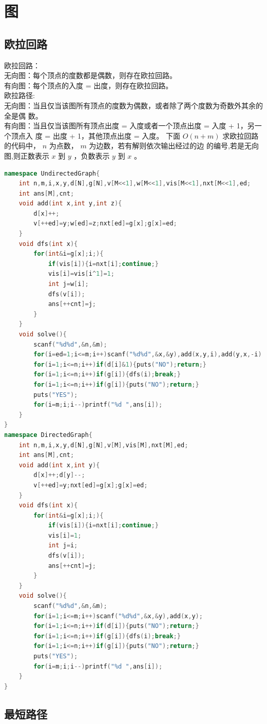 \documentclass{article}
\begin{document}
\section{图}
\subsection{欧拉回路}
欧拉回路： \\
无向图：每个顶点的度数都是偶数，则存在欧拉回路。 \\
有向图：每个顶点的入度 = 出度，则存在欧拉回路。 \\
欧拉路径: \\
无向图：当且仅当该图所有顶点的度数为偶数，或者除了两个度数为奇数外其余的全是偶
数。 \\
有向图：当且仅当该图所有顶点出度 = 入度或者一个顶点出度 = 入度 + 1，另一个顶点入
度 = 出度 + 1，其他顶点出度 = 入度。
下面 $O(n + m)$ 求欧拉回路的代码中， $n$ 为点数， $m$ 为边数，若有解则依次输出经过的边
的编号,若是无向图,则正数表示 $x$ 到 $y$ ，负数表示 $y$ 到 $x$ 。
\begin{lstlisting}[language=C++]
namespace UndirectedGraph{
	int n,m,i,x,y,d[N],g[N],v[M<<1],w[M<<1],vis[M<<1],nxt[M<<1],ed;
	int ans[M],cnt;
	void add(int x,int y,int z){
		d[x]++;
		v[++ed]=y;w[ed]=z;nxt[ed]=g[x];g[x]=ed;
	}
	void dfs(int x){
		for(int&i=g[x];i;){
			if(vis[i]){i=nxt[i];continue;}
			vis[i]=vis[i^1]=1;
			int j=w[i];
			dfs(v[i]);
			ans[++cnt]=j;
		}
	}
	void solve(){
		scanf("%d%d",&n,&m);
		for(i=ed=1;i<=m;i++)scanf("%d%d",&x,&y),add(x,y,i),add(y,x,-i);
		for(i=1;i<=n;i++)if(d[i]&1){puts("NO");return;}
		for(i=1;i<=n;i++)if(g[i]){dfs(i);break;}
		for(i=1;i<=n;i++)if(g[i]){puts("NO");return;}
		puts("YES");
		for(i=m;i;i--)printf("%d ",ans[i]);
	}
}
namespace DirectedGraph{
	int n,m,i,x,y,d[N],g[N],v[M],vis[M],nxt[M],ed;
	int ans[M],cnt;
	void add(int x,int y){
		d[x]++;d[y]--;
		v[++ed]=y;nxt[ed]=g[x];g[x]=ed;
	}
	void dfs(int x){
		for(int&i=g[x];i;){
			if(vis[i]){i=nxt[i];continue;}
			vis[i]=1;
			int j=i;
			dfs(v[i]);
			ans[++cnt]=j;
		}
	}
	void solve(){
		scanf("%d%d",&n,&m);
		for(i=1;i<=m;i++)scanf("%d%d",&x,&y),add(x,y);
		for(i=1;i<=n;i++)if(d[i]){puts("NO");return;}
		for(i=1;i<=n;i++)if(g[i]){dfs(i);break;}
		for(i=1;i<=n;i++)if(g[i]){puts("NO");return;}
		puts("YES");
		for(i=m;i;i--)printf("%d ",ans[i]);
	}
}
\end{lstlisting}
\subsection{最短路径}
\end{document}
